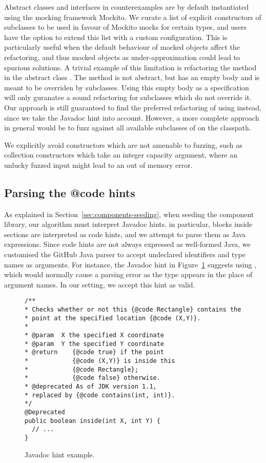 \documentclass[sigconf,review,anonymous]{acmart}
\begin{document}
Abstract classes and interfaces in counterexamples are by default instantiated
using the mocking framework Mockito. We curate a list of explicit constructors
of subclasses to be used in favour of Mockito mocks for certain types, and users
have the option to extend this list with a custom configuration. This is
particularly useful when the default behaviour of mocked objects affect the
refactoring, and thus mocked objects as under-approximation could lead to
spurious solutions. A trivial example of this limitation is refactoring the
method  in the abstract class . The
method is not abstract, but has an empty body and is meant to be overriden by
subclasses. Using this empty body as a specification will only guranatee a sound
refactoring for subclasses which do not override it. Our approach is still
guaranteed to find the preferred refactoring of using  instead,
since we take the Javadoc hint into account. However, a more complete approach
in general would be to fuzz against all available subclasses of
 on the classpath.

We explicitly avoid constructors which are not amenable to fuzzing, such as
collection constructors which take an integer capacity argument, where an
unlucky fuzzed input might lead to an out of memory error.

\subsection{Parsing the @code hints}

As explained in Section~\ref{sec:components-seeding}, when seeding the component library, our algorithm must
interpret Javadoc hints. %
in particular,  blocks inside  sections are interpreted as code
hints, and we attempt to parse them as Java expressions. Since code hints are
not always expressed as well-formed Java, we customised the
GitHub Java parser
to accept undeclared identifiers and type names
as arguments. For instance, the Javadoc hint in Figure~\ref{ex:javadoc-hint} suggests using
, which would normally cause a parsing error as the  type
appears in the place of argument names. In our setting, we accept this hint as valid.


\begin{figure}
\begin{lstlisting}[mathescape=true,showstringspaces=false]
/**
* Checks whether or not this {@code Rectangle} contains the
* point at the specified location {@code (X,Y)}.
*
* @param  X the specified X coordinate
* @param  Y the specified Y coordinate
* @return    {@code true} if the point
*            {@code (X,Y)} is inside this
*            {@code Rectangle};
*            {@code false} otherwise.
* @deprecated As of JDK version 1.1,
* replaced by {@code contains(int, int)}.
*/
@Deprecated
public boolean inside(int X, int Y) {
  // ...
}
\end{lstlisting}
\caption{Javadoc hint example.}
\label{ex:javadoc-hint}
\end{figure}
\end{document}
